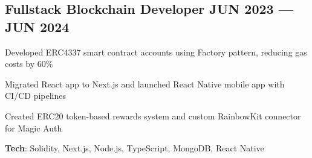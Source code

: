 \documentclass[letter,10pt]{article}
\begin{document}
\subsection{{ Fullstack Blockchain Developer \hfill JUN 2023 --- JUN 2024}}
\begin{zitemize}
  \item Developed ERC4337 smart contract accounts using Factory pattern, reducing gas costs by 60\%
  \item Migrated React app to Next.js and launched React Native mobile app with CI/CD pipelines
  \item Created ERC20 token-based rewards system and custom RainbowKit connector for Magic Auth
  \item \textbf{Tech}: Solidity, Next.js, Node.js, TypeScript, MongoDB, React Native
\end{zitemize}

\end{document}
